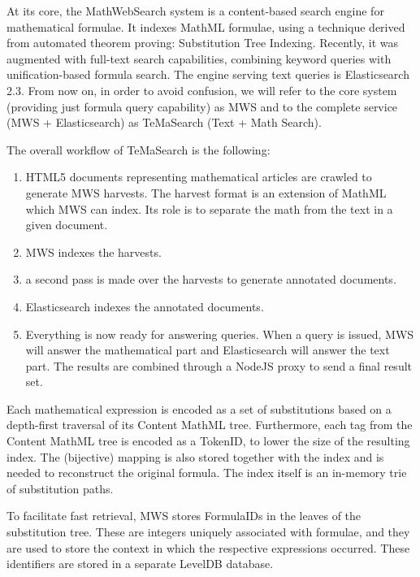 \documentclass{deliverablereport}
\begin{document}
At its core, the MathWebSearch system is a content-based search engine for mathematical formulae. It indexes MathML formulae, using a technique derived from automated theorem proving: Substitution Tree Indexing. Recently, it was augmented with full-text search capabilities, combining keyword queries with unification-based formula search. The engine serving text queries is Elasticsearch 2.3. From now on, in order to avoid confusion, we will refer to the core system (providing just formula query capability) as MWS and to the complete service (MWS + Elasticsearch) as TeMaSearch (Text + Math Search). \par

The overall workflow of TeMaSearch is the following: \par
\begin{enumerate}
\item HTML5 documents representing mathematical articles are crawled to generate MWS harvests. The harvest format is an extension of MathML which MWS can index. Its role is to separate the math from the text in a given document.
\item MWS indexes the harvests.
\item a second pass is made over the harvests to generate annotated documents.
\item Elasticsearch indexes the annotated documents.
\item Everything is now ready for answering queries. When a query is issued, MWS will answer the mathematical part and Elasticsearch will answer the text part. The results are combined through a NodeJS proxy to send a final result set.
\end{enumerate}

Each mathematical expression is encoded as a set of substitutions based on a depth-first traversal of its Content MathML tree. Furthermore, each tag from the Content MathML tree is encoded as a TokenID, to lower the size of the resulting index. The (bijective) mapping is also stored together with the index and is needed to reconstruct the original formula. The index itself is an in-memory trie of substitution paths. \par

To facilitate fast retrieval, MWS stores FormulaIDs in the leaves of the substitution tree. These are integers uniquely associated with formulae, and they are used to store the context in which the respective expressions occurred. These identifiers are stored in a separate LevelDB database. \par
\end{document}
